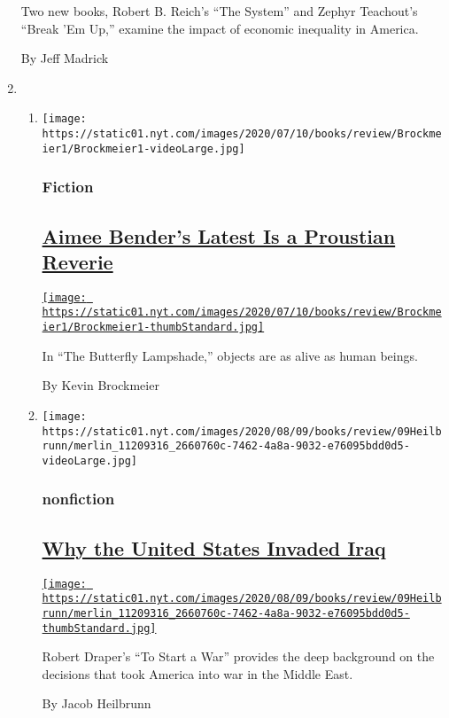 \begin{enumerate}
  Two new books, Robert B. Reich's ``The System'' and Zephyr Teachout's
  ``Break 'Em Up,'' examine the impact of economic inequality in
  America.

  By Jeff Madrick
\item
  \begin{enumerate}
  \def\labelenumii{\arabic{enumii}.}
  \item
    \texttt{[image: https://static01.nyt.com/images/2020/07/10/books/review/Brockmeier1/Brockmeier1-videoLarge.jpg]}

    \hypertarget{fiction}{%
    \subsubsection{Fiction}\label{fiction}}

    \hypertarget{aimee-benders-latest-is-a-proustian-reverie}{%
    \subsection{\texorpdfstring{\href{/2020/07/28/books/review/aimee-bender-the-butterfly-lampshade.html}{Aimee
    Bender's Latest Is a Proustian
    Reverie}}{Aimee Bender's Latest Is a Proustian Reverie}}\label{aimee-benders-latest-is-a-proustian-reverie}}

    \href{/2020/07/28/books/review/aimee-bender-the-butterfly-lampshade.html}{\texttt{[image: https://static01.nyt.com/images/2020/07/10/books/review/Brockmeier1/Brockmeier1-thumbStandard.jpg]}}

    In ``The Butterfly Lampshade,'' objects are as alive as human
    beings.

    By Kevin Brockmeier
  \item
    \texttt{[image: https://static01.nyt.com/images/2020/08/09/books/review/09Heilbrunn/merlin\_11209316\_2660760c-7462-4a8a-9032-e76095bdd0d5-videoLarge.jpg]}

    \hypertarget{nonfiction-2}{%
    \subsubsection{nonfiction}\label{nonfiction-2}}

    \hypertarget{why-the-united-states-invaded-iraq}{%
    \subsection{\texorpdfstring{\href{/2020/07/28/books/review/to-start-a-war-robert-draper.html}{Why
    the United States Invaded
    Iraq}}{Why the United States Invaded Iraq}}\label{why-the-united-states-invaded-iraq}}

    \href{/2020/07/28/books/review/to-start-a-war-robert-draper.html}{\texttt{[image: https://static01.nyt.com/images/2020/08/09/books/review/09Heilbrunn/merlin\_11209316\_2660760c-7462-4a8a-9032-e76095bdd0d5-thumbStandard.jpg]}}

    Robert Draper's ``To Start a War'' provides the deep background on
    the decisions that took America into war in the Middle East.

    By Jacob Heilbrunn
  \end{enumerate}
\end{enumerate}

